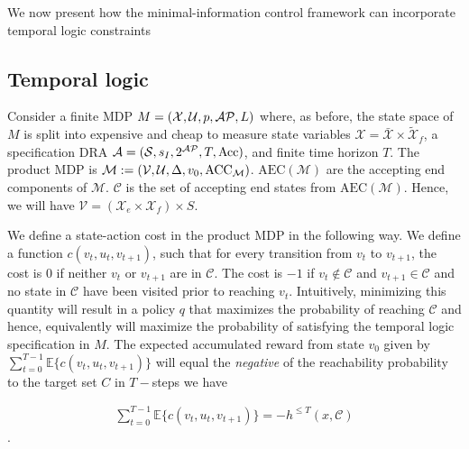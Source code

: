 We now present how the minimal-information control framework can incorporate temporal logic constraints
\subsection{Temporal logic}
Consider a finite MDP $M=(\mathcal{X},\mathcal{U},p,\mathcal{AP},L)$ where, as before, the state space of $M$ is split into expensive and cheap to measure state variables $\mathcal{X} = \mathcal{\bar{X}} \times \mathcal{\tilde{X}}_f$, a specification DRA $\mathcal{A} = (\mathcal{S},s_I,2^{\mathcal{AP}}, T,\textrm{Acc})$, and finite time horizon $T$. The product MDP is $\mathcal{M}:= (\mathcal{V},\mathcal{U}, \Delta,v_0,\textrm{ACC}_{\mathcal{M}})$. $\textrm{AEC}(\mathcal{M})$ are the accepting end components of $\mathcal{M}$. $\mathcal{C}$ is the set of accepting end states from $\textrm{AEC}(\mathcal{M})$.  Hence, we will have $\mathcal{V} = (\mathcal{X}_e \times \mathcal{X}_f) \times S$. 

We define a state-action cost in the product MDP in the following way. We define a function $c(v_t,u_t,v_{t+1})$, such that for every transition from $v_t$ to $v_{t+1}$, the cost is $0$ if neither $v_t$ or $v_{t+1}$ are in $\mathcal{C}$. The cost is $-1$ if $v_t \notin \mathcal{C}$ and $v_{t+1} \in \mathcal{C}$ and no state in $\mathcal{C}$ have been visited prior to reaching $v_t$.  Intuitively, minimizing this quantity will result in a policy $q$ that maximizes the probability of reaching $\mathcal{C}$ and hence, equivalently will maximize the probability of satisfying the temporal logic specification in $M$. The expected accumulated reward from state $v_0$ given by $\sum_{t=0}^{T-1}\mathbb{E}\{c(v_t,u_t,v_{t+1})\}$ will equal the \emph{negative} of the reachability probability to the target set $C$ in $T-$steps \ie we have

\begin{align*}
\sum_{t=0}^{T-1}\mathbb{E}\{c(v_t,u_t,v_{t+1})\} = -h^{\leq T}(x,\mathcal{C})
\end{align*}.


